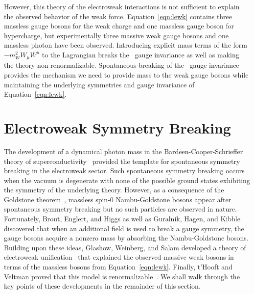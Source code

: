 However, this theory of the electroweak interactions is not sufficient to explain the observed behavior of the weak force.
Equation~\ref{eqn:lewk} contains three massless gauge bosons for the weak charge and one massless gauge boson for hypercharge, but experimentally three massive weak gauge bosons and one massless photon have been observed. 
Introducing explicit mass terms of the form $-m_W^2 W_\mu W^\mu$ to the Lagrangian breaks the \sutwo\ gauge invariance as well as making the theory non-renormalizable. 
Spontaneous breaking of the \sutwo\ gauge invariance provides the mechanism we need to provide mass to the weak gauge bosons while maintaining the underlying symmetries and gauge invariance of Equation~\ref{eqn:lewk}.

\section{Electroweak Symmetry Breaking}
\label{sec:ewsb}

The development of a dynamical photon mass in the Bardeen-Cooper-Schrieffer theory of superconductivity~\cite{} provided the template for spontaneous symmetry breaking in the electroweak sector.
Such spontaneous symmetry breaking occurs when the vacuum is degenerate with none of the possible ground states exhibiting the symmetry of the underlying theory.
However, as a consequence of the Goldstone theorem~\cite{}, massless spin-0 Nambu-Goldstone bosons appear after spontaneous symmetry breaking but no such particles are observed in nature.
Fortunately, Brout, Englert, and Higgs as well as Guralnik, Hagen, and Kibble discovered that when an additional field is used to break a gauge symmetry, the gauge bosons acquire a nonzero mass by absorbing the Nambu-Goldstone bosons. 
Building upon these ideas, Glashow, Weinberg, and Salam developed a theory of electroweak unification~\cite{} that explained the observed massive weak bosons in terms of the massless bosons from Equation~\ref{eqn:lewk}.
Finally, t'Hooft and Veltman proved that this model is renormalizable~\cite{}.
We shall walk through the key points of these developments in the remainder of this section.

